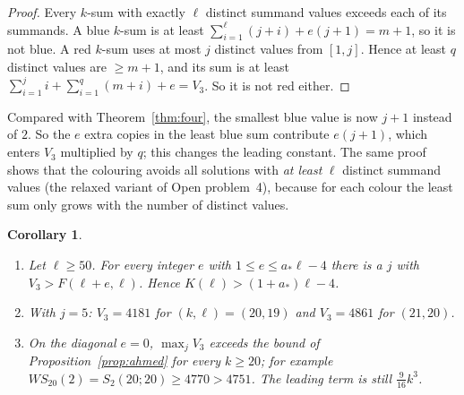 \documentclass[11pt]{amsart}
\newtheorem{corollary}[theorem]{Corollary}
\theoremstyle{definition}
\newcommand{\F}{F}
\newcommand{\Stwo}{S_2}
\begin{document}
\begin{proof}
Every $k$-sum with exactly $\ell$ distinct summand values exceeds each of its summands. A blue $k$-sum is at least $\sum_{i=1}^{\ell}(j+i)+e(j+1)=m+1$, so it is not blue. A red $k$-sum uses at most $j$ distinct values from $[1,j]$. Hence at least $q$ distinct values are $\ge m+1$, and its sum is at least $\sum_{i=1}^{j}i+\sum_{i=1}^{q}(m+i)+e=V_3$. So it is not red either.
\end{proof}

\noindent Compared with Theorem~\ref{thm:four}, the smallest blue value is now $j+1$ instead of $2$. So the $e$ extra copies in the least blue sum contribute $e(j+1)$, which enters $V_3$ multiplied by $q$; this changes the leading constant. The same proof shows that the colouring avoids all solutions with \emph{at least} $\ell$ distinct summand values (the relaxed variant of Open problem~4), because for each colour the least sum only grows with the number of distinct values.

\begin{corollary}\label{cor:three}
\begin{enumerate}[label=(\alph*)]
\item Let $\ell\ge50$. For every integer $e$ with $1\le e\le a_*\ell-4$ there is a $j$ with $V_3>\F(\ell+e,\ell)$. Hence $K(\ell)>(1+a_*)\ell-4$.
\item With $j=5$: $V_3=4181$ for $(k,\ell)=(20,19)$ and $V_3=4861$ for $(21,20)$.
\item On the diagonal $e=0$, $\max_jV_3$ exceeds the bound of Proposition~\ref{prop:ahmed} for every $k\ge20$; for example $WS_{20}(2)=\Stwo(20;20)\ge4770>4751$. The leading term is still $\frac9{16}k^3$.
\end{enumerate}
\end{corollary}
\end{document}
